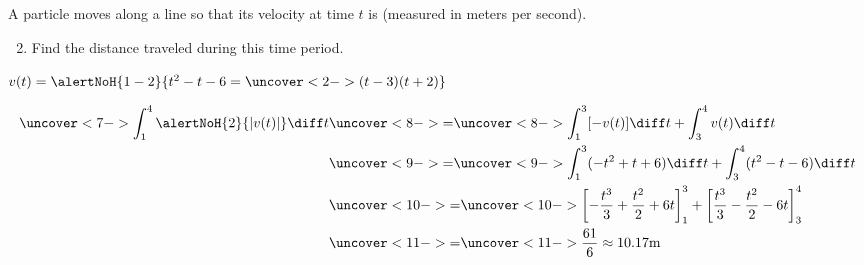 \begin{frame}[t]
\begin{example} %
A particle moves along a line so that its velocity at time $t$ is  (measured in meters per second).
\begin{enumerate}
\setcounter{enumi}{1}
\item  Find the distance traveled during this time period.
\end{enumerate}
$v(t) = \alertNoH{ 1-2}{t^2 - t - 6 = \uncover<2->{(t-3)(t+2)}}$ %
%

%
\abovedisplayskip=0pt
\belowdisplayskip=0pt
\begin{align*}
\uncover<7->{ \int_1^4 \alertNoH{ 2}{|v(t)|} \diff t }%
& \uncover<8->{=}  \uncover<8->{ \int_1^3 [-v(t)]\diff t + \int_3^4 v(t) \diff t}\\%
& \uncover<9->{=}  \uncover<9->{ \int_1^3 (-t^2 + t + 6 )\diff t + \int_3^4 (t^2 - t - 6) \diff t}\\%
& \uncover<10->{=}  \uncover<10->{ \left[ -\frac{t^3}{3} + \frac{t^2}{2} + 6t\right]_1^3 + \left[ \frac{t^3}{3} - \frac{t^2}{2} - 6t\right]_3^4}\\%
& \uncover<11->{=}  \uncover<11->{ \frac{61}{6} \approx 10.17\text{m}}
\end{align*}
\end{example}
\end{frame}
